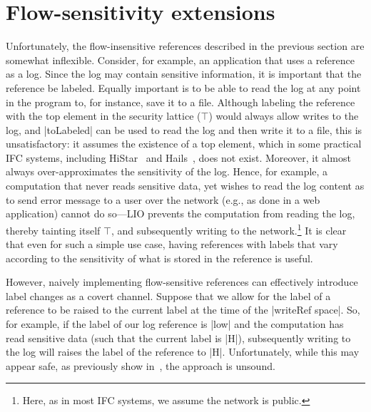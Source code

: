 \section{Flow-sensitivity extensions}
\label{sec:flow-sensitive}

Unfortunately, the flow-insensitive references described in the previous section
are somewhat inflexible.
%
Consider, for example, an application that uses a reference as a log.
%
Since the log may contain sensitive information, it is important that the
reference be labeled.
%
Equally important is to be able to read the log at any point in the program to,
for instance, save it to a file.
%
Although labeling the reference with the top element in the security
lattice ($\top$) would always allow writes to the log, and |toLabeled|
can be used to read the log and then write it to a file, this is
unsatisfactory: it assumes the existence of a top element, which in
some practical IFC systems, including HiStar~\cite{zeldovich:histar}
and Hails~\cite{giffin:hails}, does not exist.
%
Moreover, it almost always over-approximates the sensitivity of the
log.
%
Hence, for example, a computation that never reads sensitive data, yet
wishes to read the log content as to send error message to a user over
the network (e.g., as done in a web application) cannot do so---LIO
prevents the computation from reading the log, thereby tainting itself
$\top$, and subsequently writing to the network.\footnote{
  Here, as in most IFC systems, we assume the network is public.
}
%
It is clear that even for such a simple use case, having references
with labels that vary according to the sensitivity of what is stored
in the reference is useful.

However, naively implementing flow-sensitive references can effectively
introduce label changes as a covert channel. 
%
Suppose that we allow for the label of a reference to be raised to the
current label at the time of the |writeRef space|.
%
So, for example, if the label of our log reference is |low| and the
computation has read sensitive data (such that the current label is
|H|), subsequently writing to the log will raises the label of the
reference to |H|.
%
Unfortunately, while this may appear safe, as previously show
in~\cite{Austin:Flanagan:PLAS09,Russo:2010, Austin:Flanagan:PLAS10},
the approach is unsound.

